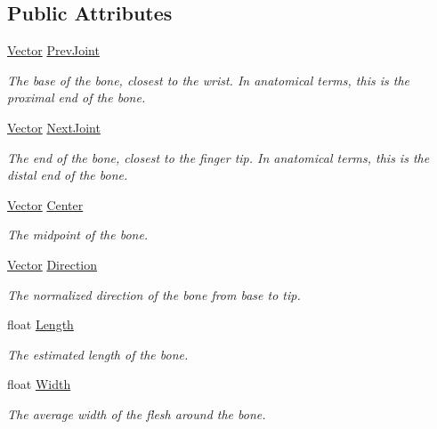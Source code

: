 \subsection*{Public Attributes}
\begin{DoxyCompactItemize}
\item 
\mbox{\hyperlink{struct_leap_1_1_vector}{Vector}} \mbox{\hyperlink{class_leap_1_1_bone_a9bf9d79aa10edd70baa3d27e8bac0730}{Prev\+Joint}}
\begin{DoxyCompactList}\small\item\em The base of the bone, closest to the wrist. In anatomical terms, this is the proximal end of the bone. \end{DoxyCompactList}\item 
\mbox{\hyperlink{struct_leap_1_1_vector}{Vector}} \mbox{\hyperlink{class_leap_1_1_bone_ac0923c0228d11208289b81ff8ed208b7}{Next\+Joint}}
\begin{DoxyCompactList}\small\item\em The end of the bone, closest to the finger tip. In anatomical terms, this is the distal end of the bone. \end{DoxyCompactList}\item 
\mbox{\hyperlink{struct_leap_1_1_vector}{Vector}} \mbox{\hyperlink{class_leap_1_1_bone_a820e1a7a9975c41ca14aec7c806b9c65}{Center}}
\begin{DoxyCompactList}\small\item\em The midpoint of the bone. \end{DoxyCompactList}\item 
\mbox{\hyperlink{struct_leap_1_1_vector}{Vector}} \mbox{\hyperlink{class_leap_1_1_bone_a15e47cfdff3b474b9da055ae15aec82e}{Direction}}
\begin{DoxyCompactList}\small\item\em The normalized direction of the bone from base to tip. \end{DoxyCompactList}\item 
float \mbox{\hyperlink{class_leap_1_1_bone_ab10b9823a94b21069ded7fe9cbf92dc8}{Length}}
\begin{DoxyCompactList}\small\item\em The estimated length of the bone. \end{DoxyCompactList}\item 
float \mbox{\hyperlink{class_leap_1_1_bone_a1bea3ae48af0c138e0423276191ed8ab}{Width}}
\begin{DoxyCompactList}\small\item\em The average width of the flesh around the bone. \end{DoxyCompactList}\item 

\end{DoxyCompactItemize}

